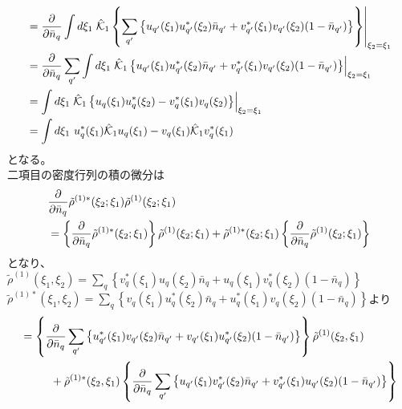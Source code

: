 \documentclass[dvipdfmx, 11pt, a4paper]{jsarticle}
\numberwithin{equation}{section}
\theoremstyle{definition}
\begin{document}
\begin{derivationBox}
\begin{align}
            &= \frac{\partial}{\partial \bar{n}_q} \int d\xi_1 \left. \hat{\mathcal{K}}_1\left\{ \sum_{q'}\left\{ u_{q'}(\xi_1)u_{q'}^*(\xi_2)\bar{n}_{q'}+v_{q'}^*(\xi_1)v_{q'}(\xi_2)(1-\bar{n}_{q'}) \right\} \right\} \right|_{\xi_2 = \xi_1} \notag \\
            &= \frac{\partial}{\partial \bar{n}_q} \sum_{q'}\int d\xi_1 \left. \hat{\mathcal{K}}_1\left\{  u_{q'}(\xi_1)u_{q'}^*(\xi_2)\bar{n}_{q'}+v_{q'}^*(\xi_1)v_{q'}(\xi_2)(1-\bar{n}_{q'})  \right\} \right|_{\xi_2 = \xi_1} \notag \\
            &= \int d\xi_1 \left. \hat{\mathcal{K}}_1\left\{  u_{q}(\xi_1)u_{q}^*(\xi_2)-v_{q}^*(\xi_1)v_{q}(\xi_2)  \right\} \right|_{\xi_2 = \xi_1} \notag \\
            &= \int d\xi_1\ u_{q}^*(\xi_1)\hat{\mathcal{K}}_1  u_{q}(\xi_1)-v_{q}(\xi_1) \hat{\mathcal{K}}_1 v_{q}^*(\xi_1)
        \end{align}
        となる。\\
        二項目の密度行列の積の微分は
        \begin{align}
            &\frac{\partial}{\partial \bar{n}_q} \tilde{\rho}^{(1)*}(\xi_2;\xi_1) \tilde{\rho}^{(1)}(\xi_2;\xi_1) \notag \\
            &= \left\{ \frac{\partial}{\partial \bar{n}_q} \tilde{\rho}^{(1)*}(\xi_2;\xi_1) \right\} \tilde{\rho}^{(1)}(\xi_2;\xi_1) +  \tilde{\rho}^{(1)*}(\xi_2;\xi_1)\left\{ \frac{\partial}{\partial \bar{n}_q} \tilde{\rho}^{(1)}(\xi_2;\xi_1) \right\}
        \end{align}
        となり、\\
        $\tilde{\rho}^{(1)}(\xi_1,\xi_2) 
        = \sum_q \left\{ v^*_q(\xi_1)u_q(\xi_2)\bar{n}_q + u_q(\xi_1) v^*_q(\xi_2) (1-\bar{n}_q)\right\} 
        $ \\ $ \tilde{\rho}^{(1)*}(\xi_1,\xi_2) 
        = \sum_q \left\{ v_q(\xi_1)u_q^*(\xi_2)\bar{n}_q + u_q^*(\xi_1) v_q(\xi_2) (1-\bar{n}_q)\right\}
        $より
        \begin{align}
            &= \left\{ \frac{\partial}{\partial \bar{n}_q} \sum_{q'} \left\{u_{q'}^*(\xi_1) v_{q'}(\xi_2)\bar{n}_{q'} + v_{q'}(\xi_1) u_{q'}^*(\xi_2) (1-\bar{n}_{q'})\right\} \right\} \tilde{\rho}^{(1)}(\xi_2,\xi_1) \notag \\
            &\ \ \ \ \ \ \ \ +  \tilde{\rho}^{(1)*}(\xi_2,\xi_1)\left\{ \frac{\partial}{\partial \bar{n}_q} \sum_{q'} \left\{ u_{q'}(\xi_1)v^*_{q'}(\xi_2)\bar{n}_{q'} + v^*_{q'}(\xi_1)u_{q'}(\xi_2)  (1-\bar{n}_{q'})\right\}\right\} \notag \\

\end{align}
\end{derivationBox}
\end{document}
